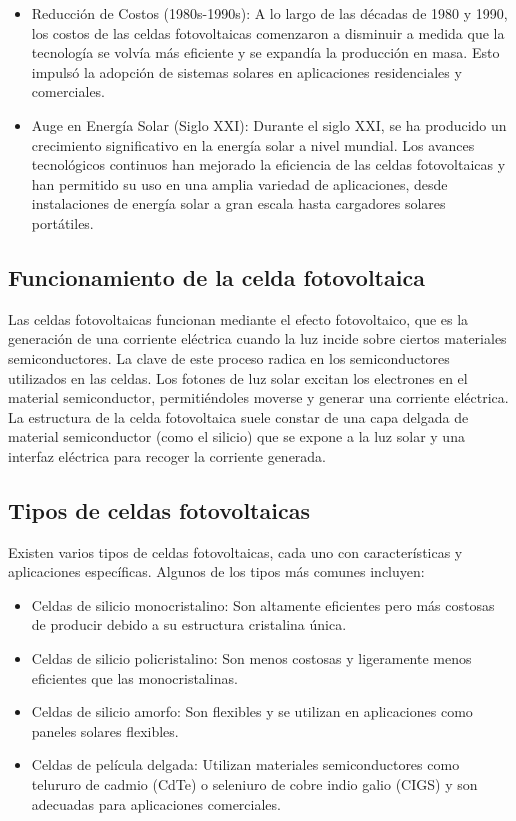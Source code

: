 \documentclass[10.5pt]{article}
\begin{document}
\begin{itemize}
        \item Reducción de Costos (1980s-1990s): A lo largo de las décadas de 1980 y 1990, los costos de las celdas fotovoltaicas comenzaron a disminuir a medida que la tecnología se volvía más eficiente y se expandía la producción en masa. Esto impulsó la adopción de sistemas solares en aplicaciones residenciales y comerciales.
        \item Auge en Energía Solar (Siglo XXI): Durante el siglo XXI, se ha producido un crecimiento significativo en la energía solar a nivel mundial. Los avances tecnológicos continuos han mejorado la eficiencia de las celdas fotovoltaicas y han permitido su uso en una amplia variedad de aplicaciones, desde instalaciones de energía solar a gran escala hasta cargadores solares portátiles.
        \end{itemize}
    \subsection{Funcionamiento de la celda fotovoltaica}
    Las celdas fotovoltaicas funcionan mediante el efecto fotovoltaico, que es la generación de una corriente eléctrica cuando la luz incide sobre ciertos materiales semiconductores. La clave de este proceso radica en los semiconductores utilizados en las celdas. Los fotones de luz solar excitan los electrones en el material semiconductor, permitiéndoles moverse y generar una corriente eléctrica. La estructura de la celda fotovoltaica suele constar de una capa delgada de material semiconductor (como el silicio) que se expone a la luz solar y una interfaz eléctrica para recoger la corriente generada.
    \subsection{Tipos de celdas fotovoltaicas}
    Existen varios tipos de celdas fotovoltaicas, cada uno con características y aplicaciones específicas. Algunos de los tipos más comunes incluyen:
    \begin{itemize}
        \item Celdas de silicio monocristalino: Son altamente eficientes pero más costosas de producir debido a su estructura cristalina única.
        \item Celdas de silicio policristalino: Son menos costosas y ligeramente menos eficientes que las monocristalinas.
        \item Celdas de silicio amorfo: Son flexibles y se utilizan en aplicaciones como paneles solares flexibles.
        \item Celdas de película delgada: Utilizan materiales semiconductores como telururo de cadmio (CdTe) o seleniuro de cobre indio galio (CIGS) y son adecuadas para aplicaciones comerciales.
    \end{itemize}
\end{document}
